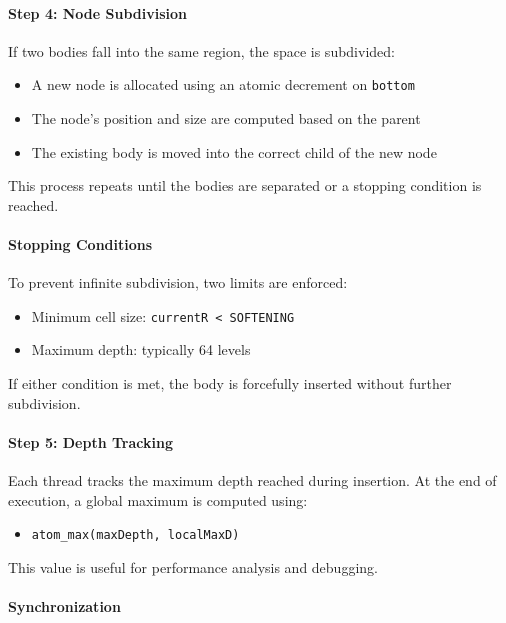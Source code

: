\documentclass[12pt]{article}
\begin{document}
\paragraph{Step 4: Node Subdivision}

If two bodies fall into the same region, the space is subdivided:

\begin{itemize}
    \item A new node is allocated using an atomic decrement on \texttt{bottom}
    \item The node's position and size are computed based on the parent
    \item The existing body is moved into the correct child of the new node
\end{itemize}

This process repeats until the bodies are separated or a stopping condition is reached.

\paragraph{Stopping Conditions}

To prevent infinite subdivision, two limits are enforced:

\begin{itemize}
    \item Minimum cell size: \texttt{currentR < SOFTENING}
    \item Maximum depth: typically 64 levels
\end{itemize}

If either condition is met, the body is forcefully inserted without further subdivision.

\paragraph{Step 5: Depth Tracking}

Each thread tracks the maximum depth reached during insertion.
At the end of execution, a global maximum is computed using:

\begin{itemize}
    \item \texttt{atom\_max(maxDepth, localMaxD)}
\end{itemize}

This value is useful for performance analysis and debugging.

\paragraph{Synchronization}
\end{document}
